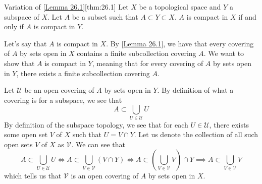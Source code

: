 \begin{thmBox}{Variation of [\hyperlink{lem:26.1}{Lemma 26.1}]}[thm:26.1]
    Let \( X \) be a topological space and \( Y \) a subspace of \( X \).
    Let \( A \) be a subset such that \( A \subset Y \subset X \).
    \( A \) is compact in \( X \) if and only if \( A \) is compact in \( Y \).

    \baseRule

    \begin{proofBox}
        Let's say that \( A \) is compact in \( X \).
        By [\hyperlink{lem:26.1}{Lemma 26.1}], we have that every covering of \( A \)
        by sets open in \( X \) contains a finite subcollection covering \( A \).
        We want to show that \( A \) is compact in \( Y \), meaning that for every 
        covering of \( A \) by sets open in \( Y \), there exists a finite subcollection
        covering \( A \).
        
        \baseSkip

        Let \( \mathcal{U} \) be an open covering of \( A \) by sets open in \( Y \).
        By definition of what a covering is for a subspace, we see that 
        \begin{equation*}
            A \subset \bigcup_{ U \in \mathcal{U} } U
        \end{equation*}
        By definition of the subspace topology, we see that for each 
        \( U \in \mathcal{U} \), there exists some open set \( V \) of \( X \) such that
        \( U = V \cap Y \).
        Let us denote the collection of all such open sets \( V \) of \( X \) as 
        \( \mathcal{V} \).
        We can see that 
        \begin{equation*}
            A \subset \bigcup_{ U \in \mathcal{U} } U
            \iff 
            A \subset \bigcup_{ V \in \mathcal{V} } ( V \cap Y )
            \iff 
            A \subset \left( \bigcup_{ V \in \mathcal{V} } V \right) \cap Y
            \implies 
            A \subset \bigcup_{ V \in \mathcal{V} } V
        \end{equation*}
        which tells us that \( \mathcal{V} \) is an open covering of \( A \) by sets 
        open in \( X \).

        \baseSkip


\end{proofBox}
\end{thmBox}
